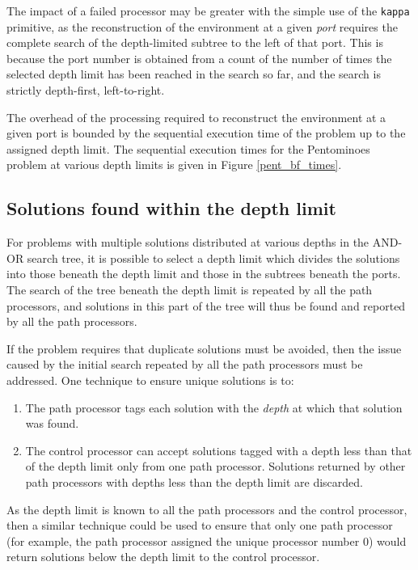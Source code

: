 The impact of a failed processor may be greater with the simple use of the
\texttt{kappa} primitive, as the reconstruction of the environment at a given
\textit{port} requires the complete search of the depth-limited subtree to
the left of that port.  This is because the port number is obtained from a
count of the number of times the selected depth limit has been reached in
the search so far, and the search is strictly depth-first, left-to-right.

The overhead of the processing required to reconstruct the environment at a given
port is bounded by the sequential execution time of the problem up to the
assigned depth limit.  The sequential execution times for the Pentominoes problem
at various depth limits is given in Figure \ref{pent_bf_times}.

\subsection{Solutions found within the depth limit}

For problems with multiple solutions distributed at various depths in the
AND-OR search tree, it is possible to select a depth limit which divides
the solutions into those beneath the depth limit and those in the subtrees
beneath the ports.  The search of the tree beneath the depth limit is repeated by
all the path processors, and solutions in this part of the tree will thus be found
and reported by all the path processors.

If the problem requires that duplicate solutions must be avoided, then the issue
caused by the initial search repeated by all the path processors must be addressed.
One technique to ensure unique solutions is to:
\begin{enumerate}
\item{The path processor tags each solution with the
  \textit{depth} at which that solution was found.}
\item{The control processor can accept solutions tagged with a depth less than
  that of the depth limit only from one path processor.  Solutions returned by
  other path processors with depths less than the depth limit are discarded.}
\end{enumerate}
As the depth limit is known to all the path processors and the control processor,
then a similar technique could be used to ensure that only one path processor
(for example, the path processor assigned the unique processor number 0) would return
solutions below the depth limit to the control processor.

